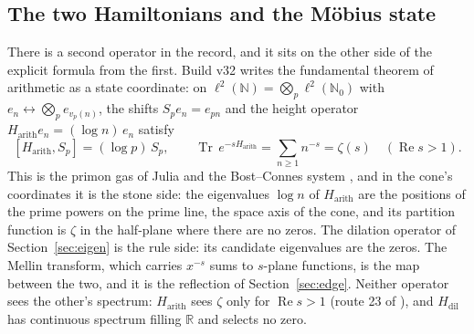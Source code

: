 \documentclass[11pt]{article}
\theoremstyle{definition}
\theoremstyle{remark}
\newcommand{\R}{\mathbb R}
\newcommand{\Ree}{\operatorname{Re}}
\begin{document}
\subsection{The two Hamiltonians and the Möbius state}\label{sec:twoH}
There is a second operator in the record, and it sits on the other side of the explicit formula from the first. Build v32 \cite{v32} writes the fundamental theorem of arithmetic as a state coordinate: on $\ell^2(\mathbb N)=\bigotimes_p\ell^2(\mathbb N_0)$ with $e_n\leftrightarrow\bigotimes_pe_{v_p(n)}$, the shifts $S_pe_n=e_{pn}$ and the height operator $H_{\mathrm{arith}}e_n=(\log n)\,e_n$ satisfy
\[
[H_{\mathrm{arith}},S_p]=(\log p)\,S_p,\qquad \operatorname{Tr}\,e^{-sH_{\mathrm{arith}}}=\sum_{n\ge1}n^{-s}=\zeta(s)\quad(\Ree s>1).
\]
This is the primon gas of Julia and the Bost--Connes system \cite{bc}, and in the cone's coordinates it is the stone side: the eigenvalues $\log n$ of $H_{\mathrm{arith}}$ are the positions of the prime powers on the prime line, the space axis of the cone, and its partition function is $\zeta$ in the half-plane where there are no zeros. The dilation operator of Section~\ref{sec:eigen} is the rule side: its candidate eigenvalues are the zeros. The Mellin transform, which carries $x^{-s}$ sums to $s$-plane functions, is the map between the two, and it is the reflection of Section~\ref{sec:edge}. Neither operator sees the other's spectrum: $H_{\mathrm{arith}}$ sees $\zeta$ only for $\Ree s>1$ (route 23 of \cite{routes}), and $H_{\mathrm{dil}}$ has continuous spectrum filling $\R$ \cite{es} and selects no zero.
\end{document}
